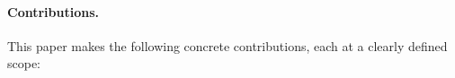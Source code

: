 



\paragraph{Contributions.}
This paper makes the following concrete contributions,
each at a clearly defined scope:

